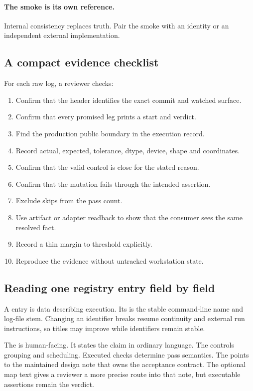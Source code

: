 \paragraph{The smoke is its own reference.}
Internal consistency replaces truth.  Pair the smoke with an identity or an
independent external implementation.

\subsection{A compact evidence checklist}

For each raw log, a reviewer checks:
\begin{enumerate}
  \item Confirm that the header identifies the exact commit and watched surface.
  \item Confirm that every promised leg prints a start and verdict.
  \item Find the production public boundary in the execution record.
  \item Record actual, expected, tolerance, dtype, device, shape and coordinates.
  \item Confirm that the valid control is close for the stated reason.
  \item Confirm that the mutation fails through the intended assertion.
  \item Exclude skips from the pass count.
  \item Use artifact or adapter readback to show that the consumer sees the
        same resolved fact.
  \item Record a thin margin to threshold explicitly.
  \item Reproduce the evidence without untracked workstation state.
\end{enumerate}

\subsection{Reading one registry entry field by field}

A  entry is data describing execution.  Its  is the stable
command-line name and log-file stem.  Changing an identifier breaks resume
continuity and external run instructions, so titles may improve while
identifiers remain stable.

The  is human-facing.  It states the claim in ordinary language.
The  controls grouping and scheduling.  Executed checks determine
pass semantics.  The
 points to the maintained design note that owns the acceptance
contract.  The optional map text gives a reviewer a more precise route into
that note, but executable assertions remain the verdict.


